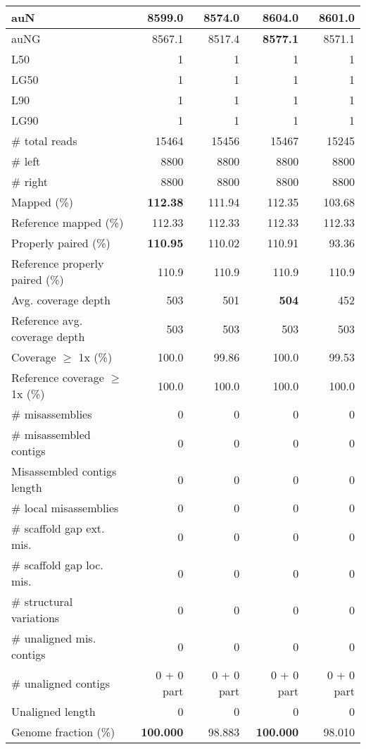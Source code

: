 \documentclass[12pt,a4paper]{article}
\begin{document}
\begin{table}[ht]
\begin{center}
\begin{tabular}{|l*{4}{|r}|}
auN & 8599.0 & 8574.0 & {\bf 8604.0} & 8601.0 \\ \hline
auNG & 8567.1 & 8517.4 & {\bf 8577.1} & 8571.1 \\ \hline
L50 & 1 & 1 & 1 & 1 \\ \hline
LG50 & 1 & 1 & 1 & 1 \\ \hline
L90 & 1 & 1 & 1 & 1 \\ \hline
LG90 & 1 & 1 & 1 & 1 \\ \hline
\# total reads & 15464 & 15456 & 15467 & 15245 \\ \hline
\# left & 8800 & 8800 & 8800 & 8800 \\ \hline
\# right & 8800 & 8800 & 8800 & 8800 \\ \hline
Mapped (\%) & {\bf 112.38} & 111.94 & 112.35 & 103.68 \\ \hline
Reference mapped (\%) & 112.33 & 112.33 & 112.33 & 112.33 \\ \hline
Properly paired (\%) & {\bf 110.95} & 110.02 & 110.91 & 93.36 \\ \hline
Reference properly paired (\%) & 110.9 & 110.9 & 110.9 & 110.9 \\ \hline
Avg. coverage depth & 503 & 501 & {\bf 504} & 452 \\ \hline
Reference avg. coverage depth & 503 & 503 & 503 & 503 \\ \hline
Coverage $\geq$ 1x (\%) & 100.0 & 99.86 & 100.0 & 99.53 \\ \hline
Reference coverage $\geq$ 1x (\%) & 100.0 & 100.0 & 100.0 & 100.0 \\ \hline
\# misassemblies & 0 & 0 & 0 & 0 \\ \hline
\# misassembled contigs & 0 & 0 & 0 & 0 \\ \hline
Misassembled contigs length & 0 & 0 & 0 & 0 \\ \hline
\# local misassemblies & 0 & 0 & 0 & 0 \\ \hline
\# scaffold gap ext. mis. & 0 & 0 & 0 & 0 \\ \hline
\# scaffold gap loc. mis. & 0 & 0 & 0 & 0 \\ \hline
\# structural variations & 0 & 0 & 0 & 0 \\ \hline
\# unaligned mis. contigs & 0 & 0 & 0 & 0 \\ \hline
\# unaligned contigs & 0 + 0 part & 0 + 0 part & 0 + 0 part & 0 + 0 part \\ \hline
Unaligned length & 0 & 0 & 0 & 0 \\ \hline
Genome fraction (\%) & {\bf 100.000} & 98.883 & {\bf 100.000} & 98.010 \\ \hline

\end{tabular}
\end{center}
\end{table}
\end{document}
